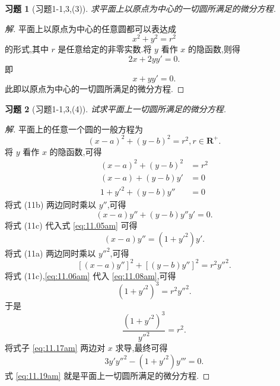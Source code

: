 \documentclass[twoside,11pt]{article}
\newtheorem*{cdtheorem}{习题}
\newenvironment{exercise}
{\begin{mdframed}[backgroundcolor=gray!40,rightline=false,leftline=false,topline=false,bottomline=false]\begin{cdtheorem}}
    {\end{cdtheorem}\end{mdframed}}
\begin{document}
\begin{exercise}[习题1-1,3,(3)]
求平面上以原点为中心的一切圆所满足的微分方程.  
\end{exercise}
\begin{proof}[解]
  平面上以原点为中心的任意圆都可以表达成
  \begin{equation}
    \label{eq:10.09pm}
    x^2+y^2=r^2
  \end{equation}
的形式,其中 $r$ 是任意给定的非零实数.将 $y$ 看作 $x$ 的隐函数,则得
\begin{equation}
  \label{eq:10.21pm}
  2x+2yy'=0.
\end{equation}
即
\begin{equation}
  \label{eq:10.22pm}
  x+yy'=0.
\end{equation}
此即以原点为中心的一切圆所满足的微分方程.
\end{proof}
\begin{exercise}[习题1-1,3,(4)]
试求平面上一切圆所满足的微分方程.  
\end{exercise}
\begin{proof}[解]
平面上的任意一个圆的一般方程为
  \begin{equation}
    \label{eq:10.28pm}
    (x-a)^2+(y-b)^2=r^2,r\in \mathbf{R}^{+}.
  \end{equation}
将 $y$ 看作 $x$ 的隐函数,可得
\begin{subequations}\label{hehe}
  \begin{align}
(x-a)^2+(y-b)^2&=r^2\\
(x-a)+(y-b)y'&=0\\
1+y'^2+(y-b)y''&=0
  \end{align}
\end{subequations}
将式 (11b) 两边同时乘以 $y''$,可得
\begin{equation}
  \label{eq:11.05am}
  (x-a)y''+(y-b)y''y'=0.
\end{equation}
将式 (11c) 代入式 \eqref{eq:11.05am} 可得
\begin{equation}
  \label{eq:11.06am}
  (x-a)y''=(1+y'^2)y'.
\end{equation}
将式 (11a) 两边同时乘以 $y''^2$,可得
\begin{equation}
  \label{eq:11.08am}
  [(x-a)y'']^2+[(y-b)y'']^2=r^2y''^2.
\end{equation}
将式 (11c),\eqref{eq:11.06am} 代入 \eqref{eq:11.08am},可得
\begin{equation}
  \label{11.10am}
  (1+y'^2)^{3}=r^2y''^2.
\end{equation}
于是
\begin{equation}
  \label{eq:11.17am}
  \frac{(1+y'^2)^3}{y''^2}=r^2.
\end{equation}
将式子 \eqref{eq:11.17am} 两边对 $x$ 求导,最终可得
\begin{equation}
  \label{eq:11.19am}
 3y'y''^2-(1+y'^2)y'''=0. 
\end{equation}
式 \eqref{eq:11.19am} 就是平面上一切圆所满足的微分方程.
\end{proof}
\end{document}
